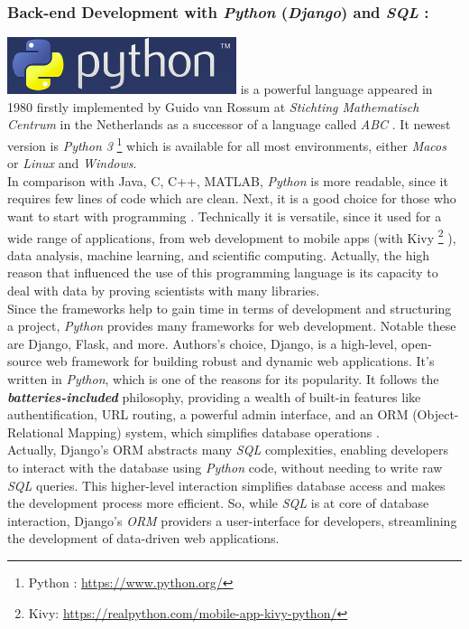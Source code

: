 \documentclass[12pt,a4paper, oneside]{book}
\begin{document}
	\subsubsection{Back-end Development with \textit{Python} (\textit{Django}) and \textit{SQL} :}  
	\includegraphics[width=0.2\linewidth]{pythonImage.png}
	 is a powerful language appeared in 1980 firstly implemented by Guido van Rossum at \textit{Stichting Mathematisch Centrum} in the Netherlands as a successor of a language called  \textit{ABC} \cite{tulchak2016history}. It newest version is \textit{Python 3} \footnote{Python : \url{https://www.python.org/}}  which is available for all most environments, either \textit{Macos} or \textit{Linux} and \textit{Windows}.\\
	 	 
	 In comparison with {Java, C, C++, MATLAB}, \textit{Python} is more readable, since it requires few lines of code which are clean. Next, it is a good choice for those who want to start with programming \cite{bogdanchikov2013python}. Technically it is versatile, since it used for a wide range of applications, from web development to mobile apps (with Kivy \footnote{Kivy: \url{https://realpython.com/mobile-app-kivy-python/}} ), data analysis, machine learning, and scientific computing. Actually, the high reason that influenced the use of this programming language is its capacity to deal with data by proving scientists with many libraries. \\
	 
	 Since the frameworks help to gain time in terms of development and structuring a project, \textit{Python} provides many frameworks for web development. Notable these are Django, Flask, and more. Authors's choice, Django, is a high-level, open-source web framework for building robust and dynamic web applications. It's written in \textit{Python}, which is one of the reasons for its popularity. It follows the \textbf{\textit{batteries-included}} philosophy, providing a wealth of built-in features like authentification, URL routing, a powerful admin interface, and an ORM (Object-Relational Mapping) system, which simplifies database operations \cite{alchin2013pro}. \\
	 
	Actually, Django's ORM abstracts many \textit{SQL} complexities, enabling developers to interact with the database using \textit{Python} code, without needing to write raw \textit{SQL} queries. This higher-level interaction simplifies database access and makes the development process more efficient. So, while \textit{SQL} is at core of database interaction, Django's \textit{ORM} providers a user-interface for developers, streamlining the development of data-driven web applications.\\ 
	
\end{document}
